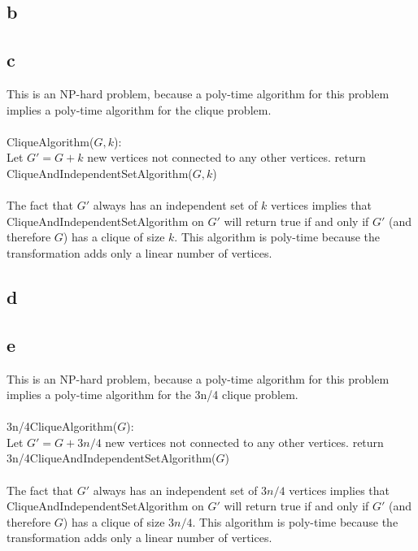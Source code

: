 \documentclass[letterpaper,notitlepage,twoside]{article}
\newcommand\tab[1][1cm]{\hspace*{#1}} %
\begin{document}
\subsection*{b}

\subsection*{c}
This is an NP-hard problem, because a poly-time algorithm for this problem implies a poly-time algorithm for the clique problem.
\\\\
CliqueAlgorithm($G, k$):\\
\tab Let $G' = G + k$ new vertices not connected to any other vertices.
\tab return CliqueAndIndependentSetAlgorithm($G, k$)
\\\\
The fact that $G'$ always has an independent set of $k$ vertices implies that CliqueAndIndependentSetAlgorithm on $G'$ will return true if and only if $G'$ (and therefore $G$) has a clique of size $k$. This algorithm is poly-time because the transformation adds only a linear number of vertices.

\subsection{d}

\subsection*{e}
This is an NP-hard problem, because a poly-time algorithm for this problem implies a poly-time algorithm for the 3n/4 clique problem.
\\\\
3n/4CliqueAlgorithm($G$):\\
\tab Let $G' = G + 3n/4$ new vertices not connected to any other vertices.
\tab return 3n/4CliqueAndIndependentSetAlgorithm($G$)
\\\\
The fact that $G'$ always has an independent set of $3n/4$ vertices implies that CliqueAndIndependentSetAlgorithm on $G'$ will return true if and only if $G'$ (and therefore $G$) has a clique of size $3n/4$. This algorithm is poly-time because the transformation adds only a linear number of vertices.
\end{document}
